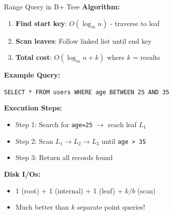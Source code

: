 \documentclass[aspectratio=169]{beamer}
\begin{document}
\begin{frame}{Range Query in B+ Tree}
  \textbf{Algorithm:}
  \begin{enumerate}
    \item \textbf{Find start key}: $O(\log_m n)$ - traverse to leaf
    \item \textbf{Scan leaves}: Follow linked list until end key
    \item \textbf{Total cost}: $O(\log_m n + k)$ where $k$ = results
  \end{enumerate}

  \vspace{0.3cm}
  \textbf{Example Query:}
  \begin{center}
  \texttt{SELECT * FROM users WHERE age BETWEEN 25 AND 35}
  \end{center}

  \textbf{Execution Steps:}
  \begin{itemize}
    \item Step 1: Search for \texttt{age=25} $\rightarrow$ reach leaf $L_1$
    \item Step 2: Scan $L_1 \rightarrow L_2 \rightarrow L_3$ until \texttt{age > 35}
    \item Step 3: Return all records found
  \end{itemize}

  \vspace{0.3cm}
  \textbf{Disk I/Os:}
  \begin{itemize}
    \item 1 (root) + 1 (internal) + 1 (leaf) + $k/b$ (scan)
    \item Much better than $k$ separate point queries!
  \end{itemize}
\end{frame}
\end{document}
